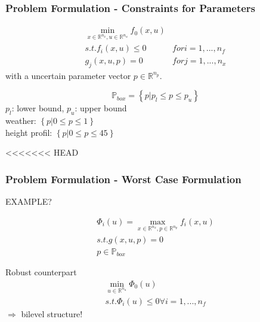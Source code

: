 

\begin{frame}
\frametitle{Problem Formulation - Constraints for Parameters}

\begin{block}
	
\begin{align*}
\min_{x\in \mathbb{R}^{n_{x}}, u\in \mathbb{R}^{n_{u}}} f_{0}(x, u)\\
s.t. f_{i}(x,u)\leq 0 &for i=1,...,n_{f}\\
g_{j}(x,u,p)=0 &for j=1,...,n_{x}
\end{align*}
with a uncertain parameter vector $p\in \mathbb{R}^{n_{p}}$.

\end{block}


\begin{block}

\begin{equation*}
\mathbb{P}_{box}=\left\{\left. p \right| p_{l}\leq p \leq p_{u}\right\}
\end{equation*}
$p_{l}$: lower bound, $p_{u}$: upper bound\\

weather: $\left\{\left. p \right| 0\leq p\leq 1\right\}$\\
height profil: $\left\{\left. p \right| 0\leq p\leq 45\right\}$

\end{block}

\end{frame}


<<<<<<< HEAD
\begin{frame}
\frametitle{Problem Formulation - Worst Case Formulation}

EXAMPLE?

\begin{align*}
\Phi_{i}(u)=\max_{x\in \mathbb{R}^{n_{x}}, p\in \mathbb{R}^{n_{p}}} f_{i}(x,u)\\
	s.t. g(x,u,p)=0\\
	p\in\mathbb{P}_{box}
\end{align*}

\begin{block}{Robust counterpart}
\begin{align*}
\min_{u\in\mathbb{R}^{n_{u}}} \Phi_{0}(u)\\
s.t. \Phi_{i}(u)\leq 0 \forall i=1,...,n_{f}
\end{align*}
$\Rightarrow$ bilevel structure!
\end{block}

\end{frame}

